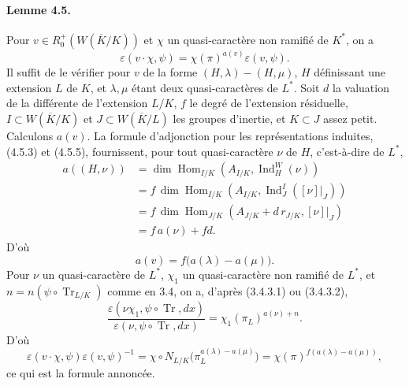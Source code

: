 \documentclass[10pt,letterpaper]{article}
\newcommand{\Hom}{\operatorname{Hom}}
\newcommand{\Ind}{\operatorname{Ind}}
\newcommand{\Tr}{\operatorname{Tr}}
\providecommand{\Hom}{\operatorname{Hom}}
\providecommand{\Hom}{\operatorname{Hom}}
\providecommand{\Tr}{\operatorname{Tr}}
\providecommand{\Hom}{\operatorname{Hom}}
\providecommand{\Tr}{\operatorname{Tr}}
\providecommand{\Tr}{\operatorname{Tr}}
\providecommand{\Ind}{\operatorname{Ind}}
\begin{document}
\paragraph{Lemme 4.5.} Pour \(v\in R^+_0(W(\overline K/K))\) et \(\chi\) un quasi-caractère non ramifié de \(K^*\), on a
\[
\varepsilon(v\cdot\chi,\psi)=\chi(\pi)^{a(v)}\varepsilon(v,\psi).
\]
Il suffit de le vérifier pour \(v\) de la forme \((H,\lambda)-(H,\mu)\), \(H\) définissant une extension \(L\) de \(K\), et \(\lambda,\mu\) étant deux quasi-caractères de \(L^*\). Soit \(d\) la valuation de la différente de l'extension \(L/K\), \(f\) le degré de l'extension résiduelle, \(I\subset W(\overline K/K)\) et \(J\subset W(\overline K/L)\) les groupes d'inertie, et \(K\subset J\) assez petit. Calculons \(a(v)\). La formule d'adjonction pour les représentations induites, (4.5.3) et (4.5.5), fournissent, pour tout quasi-caractère \(\nu\) de \(H\), c'est-à-dire de \(L^*\),
\[
\tag{4.5.1'}
\begin{aligned}
a((H,\nu))
&=\dim\Hom_{I/K}(A_{I/K},\Ind_H^W(\nu))\\
&=f\,\dim\Hom_{I/K}(A_{I/K},\Ind_J^I([\nu]|_J))\\
&=f\,\dim\Hom_{J/K}(A_{J/K}+d\,r_{J/K},[\nu]|_J)\\
&=f\,a(\nu)+fd.
\end{aligned}
\]
D'où
\[
a(v)=f\bigl(a(\lambda)-a(\mu)\bigr).
\]
Pour \(\nu\) un quasi-caractère de \(L^*\), \(\chi_1\) un quasi-caractère non ramifié de \(L^*\), et \(n=n(\psi\circ\Tr_{L/K})\) comme en 3.4, on a, d'après (3.4.3.1) ou (3.4.3.2),
\[
\frac{\varepsilon(\nu\chi_1,\psi\circ\Tr,dx)}
     {\varepsilon(\nu,\psi\circ\Tr,dx)}
=
\chi_1(\pi_L)^{a(\nu)+n}.
\]
D'où
\[
\varepsilon(v\cdot\chi,\psi)\varepsilon(v,\psi)^{-1}
=
\chi\circ N_{L/K}\bigl(\pi_L^{a(\lambda)-a(\mu)}\bigr)
=
\chi(\pi)^{f(a(\lambda)-a(\mu))},
\]
ce qui est la formule annoncée.
\end{document}
